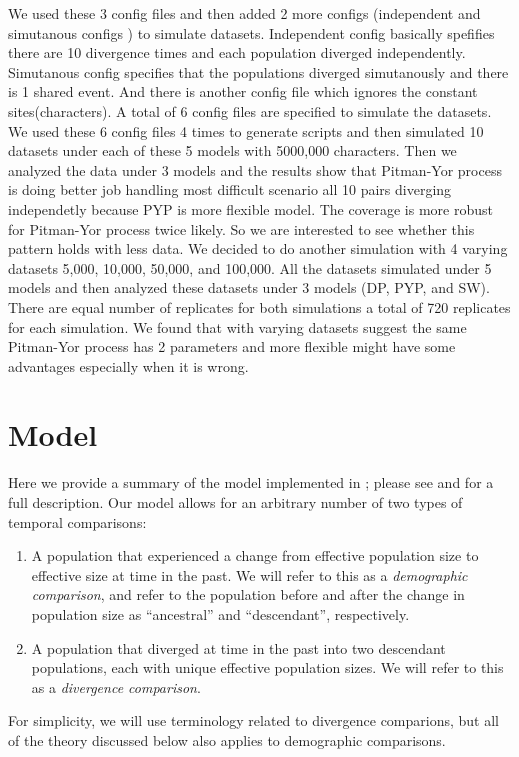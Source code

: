 \documentclass[letterpaper,12pt]{article}
\begin{document}
We used these 3 config files and then added 2 more configs (independent and simutanous configs ) to simulate datasets. Independent config 
basically spefifies there are 10 divergence times and each population diverged independently. Simutanous config specifies that the populations 
diverged simutanously and there is 1 shared event. And there is another config file which ignores the constant sites(characters). A total of 6 config 
files are specified to simulate the datasets. We used these 6 config files 4 times to generate scripts and then simulated 10 datasets under each of 
these 5 models with 5000,000 characters. Then we analyzed the data under 3 models and the results show that Pitman-Yor process is doing better job handling 
most difficult scenario all 10 pairs diverging independetly because PYP is more flexible model. The coverage is more robust for Pitman-Yor process twice likely.
So we are interested to see whether this pattern holds with less data. We decided to do another simulation with 4 varying datasets 5,000, 10,000, 50,000, and 100,000. 
All the datasets simulated under 5 models and then analyzed these datasets under 3 models (DP, PYP, and SW). There are equal number of replicates for both simulations 
a total of 720 replicates for each simulation. We found that with varying datasets suggest the same Pitman-Yor process has 2 parameters and more flexible might 
have some advantages especially when it is wrong.

\section{Model}

Here we provide a summary of the model implemented in \ecoevolity; please see
\citet{Oaks2018ecoevolity} and \citet{Oaks2019codemog} for a full description.
Our model allows for an arbitrary number of two types of temporal comparisons:
\begin{enumerate}
    \item A population that experienced a change from effective population size
        \epopsize[\rootpopindex]
        to effective size
        \epopsize[\descendantpopindex{}]
        at time \comparisonetime in the past.
        We will refer to this as a \emph{demographic comparison},
        and refer to the population before and after the change in population
        size as ``ancestral'' and ``descendant'', respectively.
    \item A population that diverged at time \comparisonetime in the past into
        two descendant populations, each with unique effective population
        sizes.
        We will refer to this as a \emph{divergence comparison}.
\end{enumerate}
For simplicity, we will use terminology related to divergence comparions, but
all of the theory discussed below also applies to demographic comparisons.
\end{document}
